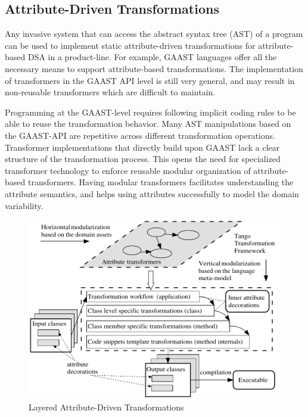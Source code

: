 \subsection{Attribute-Driven Transformations}

Any invasive \cite{java.compost} system that can access the abstract syntax tree (AST) of a program can be used to implement static attribute-driven transformations for attribute-based DSA in a product-line. For example, GAAST languages offer all the necessary means to support attribute-based transformations. The implementation of transformers in the GAAST API level is still very general, and may result in non-reusable transformers which are difficult to maintain.

Programming at the GAAST-level requires following implicit coding rules to be able to reuse the transformation behavior. Many AST manipulations based on the GAAST-API are repetitive across different transformation operations. Transformer implementations that directly build upon GAAST lack a clear structure of the transformation process. This opens the need for specialized transformer technology to enforce reusable modular organization of attribute-based transformers. Having modular transformers facilitates understanding the attribute semantics, and helps using attributes successfully to model the domain variability.

\begin{figure}[ht]
	\begin{center}
		\includegraphics[width=15cm,height=!]{ch01/tango}
	\end{center}
	\caption{Layered Attribute-Driven Transformations}
	\label{fig:ch01tango}
\end{figure}

